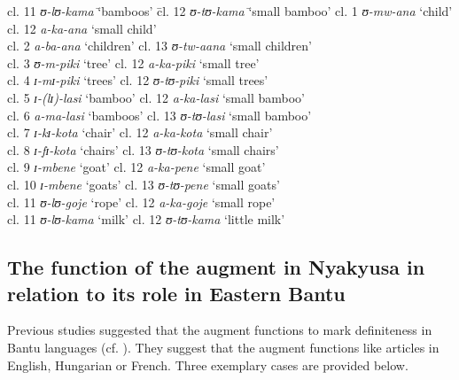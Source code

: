 \documentclass[output=paper]{langscibook}
\begin{document}
\ea%
    \label{ex:lusekelo:9}
\begin{tabbing}
    cl. 11  \= \textit{ʊ{}-lʊ{}-kama} \= ‘bamboos’  \=   cl. 12 \= \textit{ʊ{}-tʊ{}-kama} \= ‘small bamboo’\kill
  cl. 1 \> \textit{ʊ{}-mw-ana} \> ‘child’  \>   cl. 12 \> \textit{a-ka-ana} \> ‘small child’ \\
  cl. 2 \> \textit{a-ba-ana} \> ‘children’ \>  cl. 13 \> \textit{ʊ{}-tw-aana} \> ‘small children’  \\
  cl. 3 \> \textit{ʊ{}-m-piki} \> ‘tree’  \>   cl. 12 \> \textit{a-ka-piki} \>  ‘small tree’ \\
  cl. 4 \> \textit{ɪ{}-mɪ{}-piki} \> ‘trees’  \>   cl. 12 \> \textit{ʊ{}-tʊ{}-piki} \> ‘small trees’  \\
  cl. 5 \> \textit{ɪ-(lɪ){}-lasi} \> ‘bamboo’  \> cl. 12 \> \textit{a-ka-lasi} \> ‘small bamboo’ \\
  cl. 6 \> \textit{a-ma-lasi} \> ‘bamboos’  \> cl. 13 \> \textit{ʊ{}-tʊ{}-lasi} \> ‘small bamboo’ \\
  cl. 7 \> \textit{ɪ-kɪ{}-kota} \> ‘chair’   \>  cl. 12 \> \textit{a-ka-kota} \> ‘small chair’ \\
  cl. 8 \> \textit{ɪ-fɪ{}-kota} \> ‘chairs’ \>  cl. 13 \> \textit{ʊ{}-tʊ{}-kota} \> ‘small chairs’ \\
  cl. 9 \> \textit{ɪ{}-mbene} \> ‘goat’  \>   cl. 12  \> \textit{a{}-ka-pene} \> ‘small goat’ \\
  cl. 10 \> \textit{ɪ{}-mbene} \> ‘goats’  \> cl. 13 \> \textit{ʊ{}-tʊ{}-pene} \> ‘small goats’ \\
  cl. 11 \> \textit{ʊ{}-lʊ{}-}{\textit{g}}\textit{oje} \> ‘rope’   \>  cl. 12  \> \textit{a-ka-}{\textit{g}}\textit{oje} \> ‘small rope’ \\
  cl. 11 \> \textit{ʊ{}-lʊ{}-kama} \> ‘milk’   \>  cl. 12 \> \textit{ʊ{}-tʊ{}-kama} \> ‘little milk’
\end{tabbing}
\z

\subsection{The function of the augment in Nyakyusa in relation to its role in Eastern Bantu}\label{sec:lusekelo:2.2}  %
\largerpage

Previous studies suggested that the augment functions to mark definiteness in Bantu languages (cf. \citealt{DeBlois1970, Bokamba1971, HymanKatamba1993, Legère2005, Visser2010, Goodness2013, Asiimwe2014, PetzellKühl2017}). They suggest that the augment functions like articles in English, Hungarian or French. Three exemplary cases are provided below. 
\end{document}
